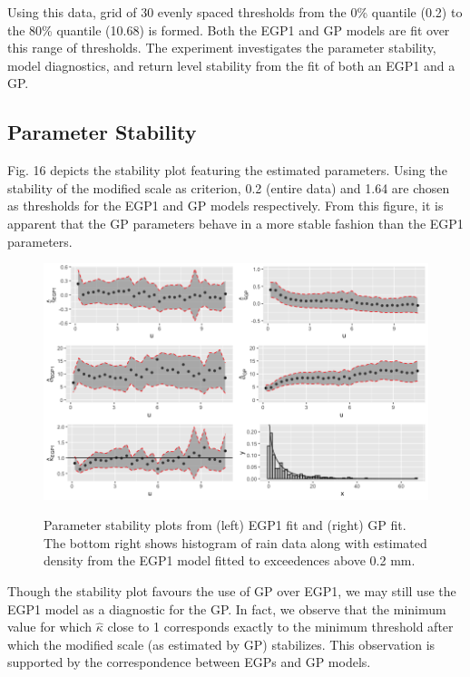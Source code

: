 \documentclass[12pt]{article}
\theoremstyle{definition}
\theoremstyle{definition}
\begin{document}
Using this data, grid of 30 evenly spaced thresholds from the 0\% quantile (0.2) to the 80\% quantile (10.68) is formed. Both the EGP1 and GP models are fit over this range of thresholds. The experiment investigates the parameter stability, model diagnostics, and return level stability from the fit of both an EGP1 and a GP.

\subsection{Parameter Stability}
Fig. 16 depicts the stability plot featuring the estimated parameters. Using the stability of the modified scale as criterion, 0.2 (entire data) and 1.64 are chosen as thresholds for the EGP1 and GP models respectively. From this figure, it is apparent that the GP parameters behave in a more stable fashion than the EGP1 parameters.

\begin{figure}[H]
\begin{center}
{\includegraphics[width=4.5in]{project/papafiles/rain.stab.png}}
\caption{Parameter stability plots from (left) EGP1 fit and (right) GP fit. The bottom right shows histogram of rain data along with estimated density from the EGP1 model fitted to exceedences above 0.2 mm.}
\end{center}
\end{figure}
Though the stability plot favours the use of GP over EGP1, we may still use the EGP1 model as a diagnostic for the GP. In fact, we observe that the minimum value for which $\hat \kappa$ close to 1 corresponds exactly to the minimum threshold after which the modified scale (as estimated by GP) stabilizes. This observation is supported by the correspondence between EGPs and GP models.
\end{document}
